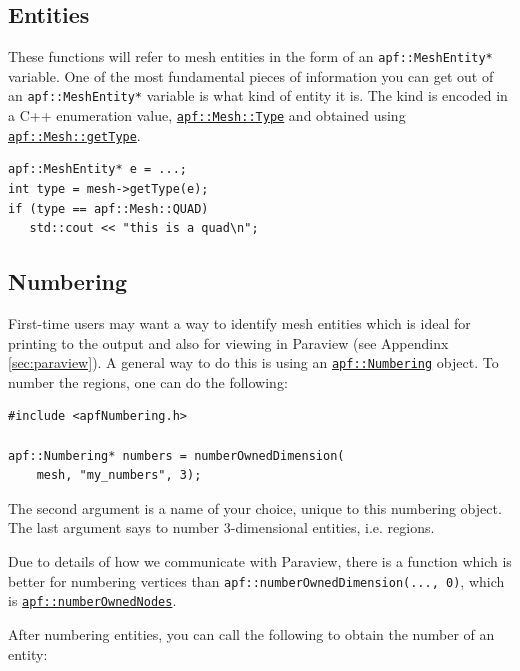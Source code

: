 \documentclass{article}
\begin{document}
\subsection{Entities}

These functions will refer to mesh entities in the
form of an \texttt{apf::MeshEntity*} variable.
One of the most fundamental pieces of information you can get
out of an \texttt{apf::MeshEntity*} variable is what kind of
entity it is.
The kind is encoded in a C++ enumeration value,
\href{http://scorec.rpi.edu/~dibanez/core/classapf_1_1Mesh.html#a68729141a3c5781a24bb72ea6160b898}{\texttt{apf::Mesh::Type}}
and obtained using
\href{http://scorec.rpi.edu/~dibanez/core/classapf_1_1Mesh.html#a233fb2ada6d244ea1fffbbdd76e2f6b8}{\texttt{apf::Mesh::getType}}.

\begin{lstlisting}
apf::MeshEntity* e = ...;
int type = mesh->getType(e);
if (type == apf::Mesh::QUAD)
   std::cout << "this is a quad\n";
\end{lstlisting}

\subsection{Numbering}
\label{sec:num}

First-time users may want a way to identify mesh entities which
is ideal for printing to the output and also for viewing in
Paraview (see Appendinx \ref{sec:paraview}).
A general way to do this is using an
\href{http://scorec.rpi.edu/~dibanez/core/apfNumbering_8h.html}{\texttt{apf::Numbering}}
object.
To number the regions, one can do the following:

\begin{lstlisting}
#include <apfNumbering.h>

apf::Numbering* numbers = numberOwnedDimension(
    mesh, "my_numbers", 3);
\end{lstlisting}

The second argument is a name of your choice, unique to this numbering object.
The last argument says to number 3-dimensional entities, i.e. regions.

Due to details of how we communicate with Paraview, there is a
function which is better for numbering vertices than
\texttt{apf::numberOwnedDimension(..., 0)}, which is
\href{http://scorec.rpi.edu/~dibanez/core/namespaceapf.html#ade73c5914c4ce70310c7a92b4f99e837}{\texttt{apf::numberOwnedNodes}}.

After numbering entities, you can call the following to obtain the number of an
entity:
\end{document}
